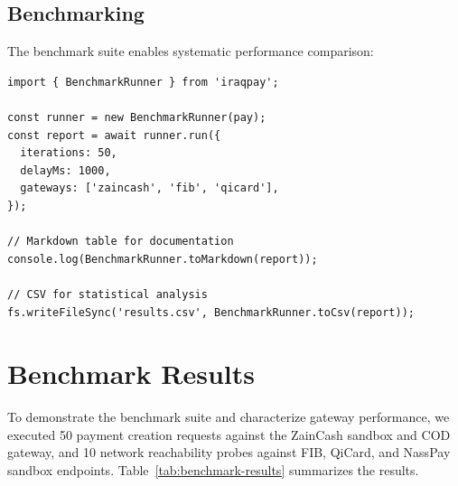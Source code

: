 \documentclass[preprint,12pt]{elsarticle}
\begin{document}
\subsection{Benchmarking}

The benchmark suite enables systematic performance comparison:

\begin{lstlisting}[style=typescript,caption={Running gateway benchmarks},label={lst:benchmark}]
import { BenchmarkRunner } from 'iraqpay';

const runner = new BenchmarkRunner(pay);
const report = await runner.run({
  iterations: 50,
  delayMs: 1000,
  gateways: ['zaincash', 'fib', 'qicard'],
});

// Markdown table for documentation
console.log(BenchmarkRunner.toMarkdown(report));

// CSV for statistical analysis
fs.writeFileSync('results.csv', BenchmarkRunner.toCsv(report));
\end{lstlisting}

\section{Benchmark Results}
\label{sec:benchmarks}

To demonstrate the benchmark suite and characterize gateway performance, we executed 50 payment creation requests against the ZainCash sandbox and COD gateway, and 10 network reachability probes against FIB, QiCard, and NassPay sandbox endpoints. Table~\ref{tab:benchmark-results} summarizes the results.
\end{document}
